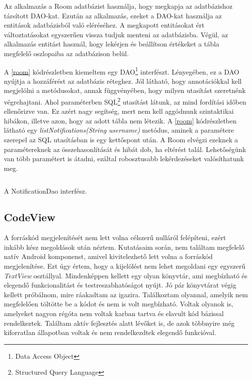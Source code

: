 \documentclass{thesis-ekf}
\theoremstyle{definition}
\theoremstyle{remark}
\begin{document}
Az alkalmazás a Room adatbázist használja, hogy megkapja az adatbázishoz társított DAO-kat.
Ezután az alkalmazás, ezeket a DAO-kat használja az entitások adatbázisból való eléréséhez.
A megkapott entitásokat ért változtatásokat egyszerűen vissza tudjuk menteni az adatbázisba.
Végül, az alkalmazás entitást használ, hogy lekérjen és beállítson értékeket a tábla megfelelő oszlopaiba az adatbázison belül.\cite{room}

A \ref{room} kódrészletben kiemeltem egy DAO\footnote{Data Access Object} interfészt.
Lényegében, ez a DAO nyújtja a hozzáférést az adatbázis réteghez.
Jól látható, hogy annotációkkal kell megjelölni a metódusokat, annak függvényében, hogy milyen utasítást szeretnénk végrehajtani.
Ahol paraméterben SQL\footnote{Structured Query Language} utasítást látunk, az mind fordítási időben ellenőrizve van.
Ez azért nagy segítség, mert nem kell aggódnunk szintaktikai hibákon, illetve azon, hogy az adott tábla nem létezik.
A \ref{room} kódrészletben látható egy \emph{listNotifications(String username)} metódus, aminek a paramétere szerepel az SQL utasításban is egy kettőspont után.
A Room elvégzi ezeknek a paramétereknek az összehasonlítását és hibát dob, ha eltérést talál.
Lehetőségünk van több paramétert is átadni, ezáltal robosztusabb lekérdezéseket valósíthatunk meg.

\begin{listing}[ht]
	\inputminted[linenos=true]{java}{./codes/NotificationDao.java}
	\caption{A NotificationDao interfész.}
	\label{room}
\end{listing}

\subsection{CodeView}\label{code_view}

A forráskód megjelenítését nem lett volna célszerű nulláról felépíteni, ezért inkább kész megoldások után néztem.
Kutatásaim során, nem találtam megfelelő natív Android komponenst, amivel kivitelezhető lett volna a forráskód megjelenítése.
Ezt úgy értem, hogy a kijelölést nem lehet megoldani egy egyszerű \emph{TextView} osztállyal.
Mindenképpen kellett egy olyan könyvtár, ami megbízható és elegendő funkcionalitást és testreszabhatóságot nyújt.
Jó pár könyvtárat végig kellett próbálnom, mire ráakadtam az igazira.
Találkoztam olyannal, amelyik nem megfelelően töltötte be a kódot és nem is volt megbízható.
Voltak olyanok is, amelyeket nagyon régóta nem voltak karban tartva és elavult kód bázissal rendelkeztek.
Találtam aktív fejlesztés alatt lévőket is, de azok többnyire még kiforratlan állapotban voltak és nem rendelkezdtek elegendő funkcióval.
\end{document}
